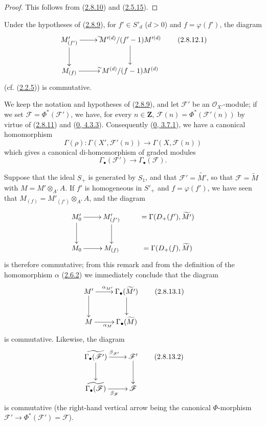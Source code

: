 \begin{proof}
This follows from (\hyperref[II.2.8.10]{2.8.10}) and
(\hyperref[II.2.5.15]{2.5.15}).
\end{proof}


\begin{env}[2.8.12]
\label{II.2.8.12}
Under the hypotheses of (\hyperref[II.2.8.9]{2.8.9}), for
$f'\in S'_d$ ($d>0$) and $f=\varphi(f')$, the diagram
\[
\label{II.2.8.12.1}
  \xymatrix{
    M'_{(f')}\ar[r]^{\sim}\ar[d]
    & M'^{(d)}/(f'-1)M'^{(d)}\ar[d]\\
    M_{(f)}\ar[r]^{\sim}
    & M^{(d)}/(f-1)M^{(d)}
  }
\tag{2.8.12.1}
\]
(cf. (\hyperref[II.2.2.5]{2.2.5})) is commutative.
\end{env}

\begin{env}[2.8.13]
\label{II.2.8.13}
We keep the notation and hypotheses of (\hyperref[II.2.8.9]{2.8.9}), and
let $\mathcal{F}'$ be an $\mathcal{O}_{X'}$-module; if we set
$\mathcal{F}=\Phi^*(\mathcal{F}')$, we have, for every $n\in\mathbf{Z}$,
$\mathcal{F}(n)=\Phi^*(\mathcal{F}'(n))$ by virtue of
(\hyperref[II.2.8.11]{2.8.11}) and
(\hyperref[0.4.3.3]{0, 4.3.3}). Consequently
(\hyperref[0.3.7.1]{0, 3.7.1}), we have a canonical homomorphism
\[
  \Gamma(\rho):\Gamma(X',\mathcal{F}'(n))
  \longrightarrow\Gamma(X,\mathcal{F}(n))
\]
which gives a canonical di-homomorphism of graded modules
\[
  \Gamma_\bullet(\mathcal{F}')\longrightarrow
  \Gamma_\bullet(\mathcal{F}).
\]

Suppose that the ideal $S_+$ is generated by $S_1$, and that
$\mathcal{F}'=\widetilde{M'}$, so that $\mathcal{F}=\widetilde{M}$ with
$M=M'\otimes_{A'}A$. If $f'$ is homogeneous in $S'_+$ and
$f=\varphi(f')$, we have seen that
$M_{(f)}=M'_{(f')}\otimes_{A'}A$, and the diagram
\[
  \xymatrix{
    M'_0\ar[r]\ar[d]
    & M'_{(f')}\ar[d]
    & =\Gamma(D_+(f'),\widetilde{M'})\\
    M_0\ar[r]
    & M_{(f)}
    & =\Gamma(D_+(f),\widetilde{M})
  }
\]
is therefore commutative; from this remark and from the definition of the
homomorphism $\alpha$ (\hyperref[II.2.6.2]{2.6.2}) we immediately conclude
that the diagram
\[
\label{II.2.8.13.1}
  \xymatrix{
    M'\ar[r]^{\alpha_{M'}}\ar[d]
    & \Gamma_\bullet(\widetilde{M'})\ar[d]\\
    M\ar[r]_{\alpha_M}
    & \Gamma_\bullet(\widetilde{M})
  }
\tag{2.8.13.1}
\]
is commutative. Likewise, the diagram
\[
\label{II.2.8.13.2}
  \xymatrix{
    \widetilde{\Gamma_\bullet(\mathcal{F}')}\ar[r]^{\beta_{\mathcal{F}'}}
      \ar[d]
    & \mathcal{F}'\ar[d]\\
    \widetilde{\Gamma_\bullet(\mathcal{F})}\ar[r]_{\beta_{\mathcal{F}}}
    & \mathcal{F}
  }
\tag{2.8.13.2}
\]
is commutative (the right-hand vertical arrow being the canonical
$\Phi$-morphism
$\mathcal{F}'\to\Phi^*(\mathcal{F}')=\mathcal{F}$).
\end{env}

